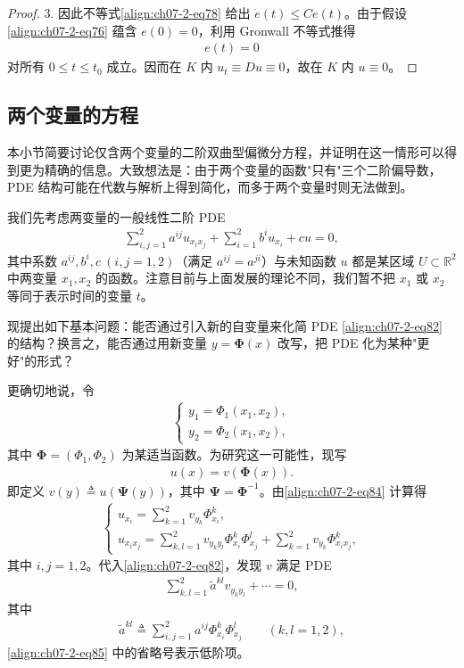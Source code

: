 \documentclass[../../main.tex]{subfiles}
\begin{document}
\begin{proof}
3. 因此不等式\eqref{align:ch07-2-eq78} 给出 $\dot{e}(t)\leqslant Ce(t)$。由于假设\eqref{align:ch07-2-eq76} 蕴含 $e(0)=0$，利用 Gronwall 不等式推得
\begin{align*}
e(t)=0
\end{align*}
对所有 $0\leqslant t\leqslant t_0$ 成立。因而在 $K$ 内 $u_t\equiv Du\equiv 0$，故在 $K$ 内 $u\equiv 0$。
\end{proof}

\subsection{两个变量的方程}\label{subsection:ch07-2-5-两个变量的方程}

本小节简要讨论仅含两个变量的二阶双曲型偏微分方程，并证明在这一情形可以得到更为精确的信息。大致想法是：由于两个变量的函数"只有"三个二阶偏导数，PDE 结构可能在代数与解析上得到简化，而多于两个变量时则无法做到。

我们先考虑两变量的一般线性二阶 PDE
\begin{align}
\sum_{i,j=1}^2 a^{ij}u_{x_ix_j}+\sum_{i=1}^2 b^i u_{x_i}+cu=0,\label{align:ch07-2-eq82}
\end{align}
其中系数 $a^{ij},b^i,c\ (i,j=1,2)$（满足 $a^{ij}=a^{ji}$）与未知函数 $u$ 都是某区域 $U\subset\mathbb{R}^2$ 中两变量 $x_1,x_2$ 的函数。注意目前与上面发展的理论不同，我们暂不把 $x_1$ 或 $x_2$ 等同于表示时间的变量 $t$。

现提出如下基本问题：能否通过引入新的自变量来化简 PDE \eqref{align:ch07-2-eq82} 的结构？换言之，能否通过用新变量 $y=\boldsymbol{\Phi}(x)$ 改写，把 PDE 化为某种"更好"的形式？

更确切地说，令
\begin{align}
\begin{cases}
y_1=\Phi_1(x_1,x_2),\\
y_2=\Phi_2(x_1,x_2),
\end{cases}\label{align:ch07-2-eq83}
\end{align}
其中 $\boldsymbol{\Phi}=(\Phi_1,\Phi_2)$ 为某适当函数。为研究这一可能性，现写
\begin{align}
u(x)=v(\boldsymbol{\Phi}(x)).\label{align:ch07-2-eq84}
\end{align}
即定义 $v(y)\triangleq u(\boldsymbol{\Psi}(y))$，其中 $\boldsymbol{\Psi}=\boldsymbol{\Phi}^{-1}$。由\eqref{align:ch07-2-eq84} 计算得
\begin{align*}
\begin{cases}
u_{x_i}=\displaystyle\sum_{k=1}^2 v_{y_k}\Phi^k_{x_i},\\
u_{x_ix_j}=\displaystyle\sum_{k,l=1}^2 v_{y_ky_l}\Phi^k_{x_i}\Phi^l_{x_j}+\sum_{k=1}^2 v_{y_k}\Phi^k_{x_ix_j},
\end{cases}
\end{align*}
其中 $i,j=1,2$。代入\eqref{align:ch07-2-eq82}，发现 $v$ 满足 PDE
\begin{align}
\sum_{k,l=1}^2 \widetilde{a}^{kl}v_{y_ky_l}+\cdots=0,\label{align:ch07-2-eq85}
\end{align}
其中
\begin{align}
\widetilde{a}^{kl}\triangleq \sum_{i,j=1}^2 a^{ij}\Phi^k_{x_i}\Phi^l_{x_j}\qquad (k,l=1,2),\label{align:ch07-2-eq86}
\end{align}
\eqref{align:ch07-2-eq85} 中的省略号表示低阶项。
\end{document}
